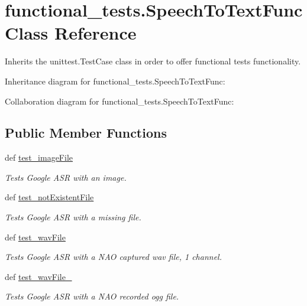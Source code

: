 \hypertarget{classfunctional__tests_1_1SpeechToTextFunc}{\section{functional\-\_\-tests.\-Speech\-To\-Text\-Func Class Reference}
\label{classfunctional__tests_1_1SpeechToTextFunc}
}


Inherits the unittest.\-Test\-Case class in order to offer functional tests functionality.  




Inheritance diagram for functional\-\_\-tests.\-Speech\-To\-Text\-Func\-:


Collaboration diagram for functional\-\_\-tests.\-Speech\-To\-Text\-Func\-:
\subsection*{Public Member Functions}
\begin{DoxyCompactItemize}
\item 
def \hyperlink{classfunctional__tests_1_1SpeechToTextFunc_ab33701bb946c7e8c80d8a5b6e7c4abfc}{test\-\_\-image\-File}
\begin{DoxyCompactList}\small\item\em Tests Google A\-S\-R with an image. \end{DoxyCompactList}\item 
def \hyperlink{classfunctional__tests_1_1SpeechToTextFunc_ae5fda4eac95917536723e8134b50a353}{test\-\_\-not\-Existent\-File}
\begin{DoxyCompactList}\small\item\em Tests Google A\-S\-R with a missing file. \end{DoxyCompactList}\item 
def \hyperlink{classfunctional__tests_1_1SpeechToTextFunc_a1038ecffd4b8c2d0ceb9626aedefe2c9}{test\-\_\-wav\-File}
\begin{DoxyCompactList}\small\item\em Tests Google A\-S\-R with a N\-A\-O captured wav file, 1 channel. \end{DoxyCompactList}\item 
def \hyperlink{classfunctional__tests_1_1SpeechToTextFunc_a1c3e6cc84f1bf7ba8efc03f3f602a4f8}{test\-\_\-wav\-File\-\_}
\begin{DoxyCompactList}\small\item\em Tests Google A\-S\-R with a N\-A\-O recorded ogg file. \end{DoxyCompactList}\end{DoxyCompactItemize}


